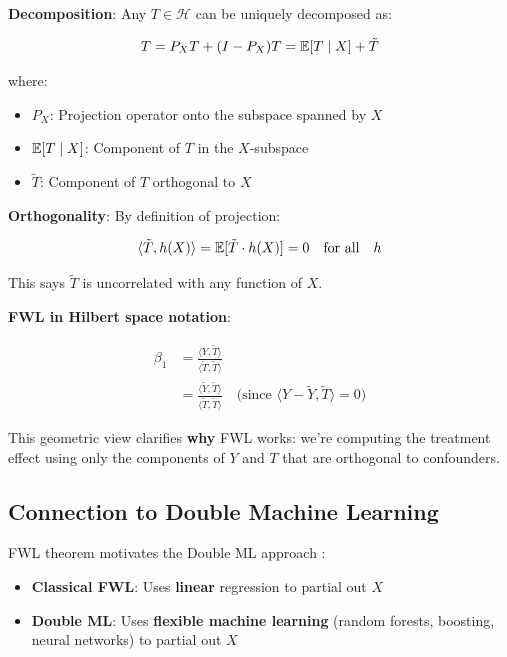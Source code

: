 \textbf{Decomposition}: Any $T \in \mathcal{H}$ can be uniquely
decomposed as:

\[T = P_X T + (I - P_X) T = \mathbb{E}[T \mid X] + \tilde{T}\]

where:
\begin{itemize}
\item $P_X$: Projection operator onto the subspace spanned by $X$
\item $\mathbb{E}[T \mid X]$: Component of $T$ in the $X$-subspace
\item $\tilde{T}$: Component of $T$ orthogonal to $X$
\end{itemize}

\textbf{Orthogonality}: By definition of projection:

\[\langle \tilde{T}, h(X) \rangle = \mathbb{E}[\tilde{T} \cdot h(X)] = 0 \quad \text{for all} \quad h\]

This says $\tilde{T}$ is uncorrelated with any function of $X$.

\textbf{FWL in Hilbert space notation}:

\begin{align}
\beta_1 &= \frac{\langle Y, \tilde{T} \rangle}{\langle \tilde{T}, \tilde{T} \rangle} \\
&= \frac{\langle \tilde{Y}, \tilde{T} \rangle}{\langle \tilde{T}, \tilde{T} \rangle} \quad \text{(since } \langle Y - \tilde{Y}, \tilde{T} \rangle = 0\text{)}
\end{align}

This geometric view clarifies \textbf{why} FWL works: we're computing
the treatment effect using only the components of $Y$ and $T$ that
are orthogonal to confounders.

\subsection{Connection to Double Machine
Learning}\label{_connection_to_double_machine_learning}

FWL theorem motivates the Double ML approach
\cite{chernozhukov2018double}:

\begin{itemize}
\item
  \textbf{Classical FWL}: Uses \textbf{linear} regression to partial out
  \(X\)
\item
  \textbf{Double ML}: Uses \textbf{flexible machine learning} (random
  forests, boosting, neural networks) to partial out \(X\)
\end{itemize}

